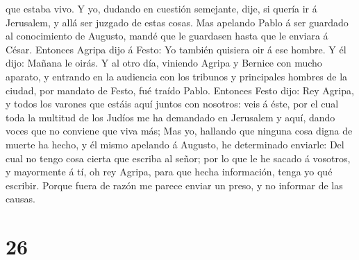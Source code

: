 que estaba vivo.  Y yo, dudando en cuestión semejante,
dije, si quería ir á Jerusalem, y allá ser juzgado de estas cosas.
 Mas apelando Pablo á ser guardado al conocimiento de
Augusto, mandé que le guardasen hasta que le enviara á César.
 Entonces Agripa dijo á Festo: Yo también quisiera oir á
ese hombre. Y él dijo: Mañana le oirás.  Y al otro día,
viniendo Agripa y Bernice con mucho aparato, y entrando en la audiencia
con los tribunos y principales hombres de la ciudad, por mandato de
Festo, fué traído Pablo.  Entonces Festo dijo: Rey
Agripa, y todos los varones que estáis aquí juntos con nosotros: veis á
éste, por el cual toda la multitud de los Judíos me ha demandado en
Jerusalem y aquí, dando voces que no conviene que viva más;
 Mas yo, hallando que ninguna cosa digna de muerte ha
hecho, y él mismo apelando á Augusto, he determinado enviarle:
 Del cual no tengo cosa cierta que escriba al señor; por
lo que le he sacado á vosotros, y mayormente á tí, oh rey Agripa, para
que hecha información, tenga yo qué escribir.  Porque
fuera de razón me parece enviar un preso, y no informar de las causas.

\hypertarget{section-25}{%
\section{26}\label{section-25}}

